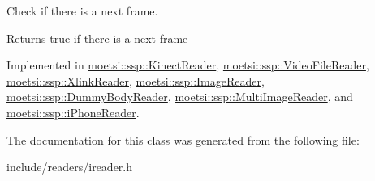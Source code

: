 Check if there is a next frame. 

\begin{DoxyReturn}{Returns}
true if there is a next frame 
\end{DoxyReturn}


Implemented in \hyperlink{classmoetsi_1_1ssp_1_1KinectReader_a08934b6eff437142e482bb21780ca171}{moetsi\+::ssp\+::\+Kinect\+Reader}, \hyperlink{classmoetsi_1_1ssp_1_1VideoFileReader_ab5733b56b6d6dd7596eac9d914481c7e}{moetsi\+::ssp\+::\+Video\+File\+Reader}, \hyperlink{classmoetsi_1_1ssp_1_1XlinkReader_ab57ff571372fbbe18f4f5f96e4bc7c21}{moetsi\+::ssp\+::\+Xlink\+Reader}, \hyperlink{classmoetsi_1_1ssp_1_1ImageReader_ad8e87720ca0ec97de501f1070119b28d}{moetsi\+::ssp\+::\+Image\+Reader}, \hyperlink{classmoetsi_1_1ssp_1_1DummyBodyReader_ab91b3c2ccdba21bae040340c34361595}{moetsi\+::ssp\+::\+Dummy\+Body\+Reader}, \hyperlink{classmoetsi_1_1ssp_1_1MultiImageReader_a04240c98d28d8949fca4ecdcb04f04f5}{moetsi\+::ssp\+::\+Multi\+Image\+Reader}, and \hyperlink{classmoetsi_1_1ssp_1_1iPhoneReader_a35ca55a03a9fb7b559f9381b11f53bfe}{moetsi\+::ssp\+::i\+Phone\+Reader}.



The documentation for this class was generated from the following file\+:\begin{DoxyCompactItemize}
\item 
include/readers/ireader.\+h\end{DoxyCompactItemize}
